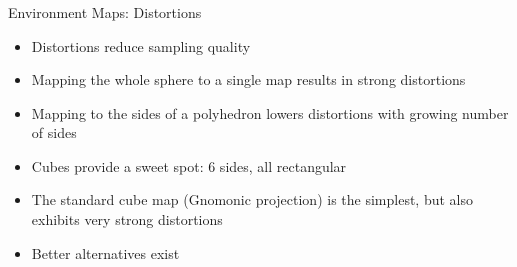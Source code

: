\documentclass[utf8,stillsansserifmath,fleqn,t]{beamer}
\begin{document}
\begin{frame}
\frametitle{\insertsection}
Environment Maps: Distortions
\begin{itemize}
\item Distortions reduce sampling quality
\item Mapping the whole sphere to a single map results in strong distortions
\item Mapping to the sides of a polyhedron lowers distortions with growing
number of sides
\item Cubes provide a sweet spot: 6 sides, all rectangular
\item The standard cube map (Gnomonic projection) is the simplest, but also
exhibits very strong distortions
\item Better alternatives exist
\end{itemize}
\end{frame}
\end{document}
